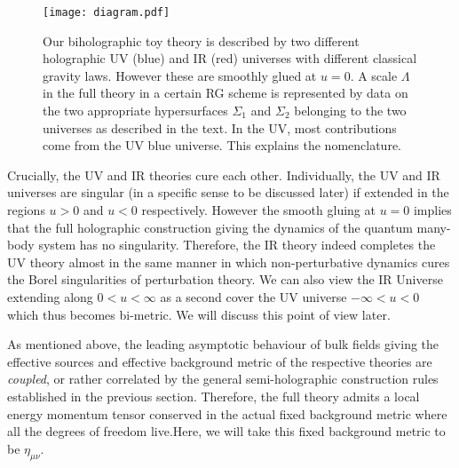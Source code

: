 \documentclass[prd,reprint,a4paper,showpacs,superscriptaddress,11pt,onecolumn,nofootinbib]{revtex4-1}
\renewcommand{\(}{\left(}
\renewcommand{\)}{\right)}
\newcommand{\6}{\partial}
\begin{document}
\begin{figure}[htbp]
\centering
\texttt{[image: diagram.pdf]}
\caption{Our biholographic toy theory is described by two different holographic UV (blue) and IR (red)  universes with different classical gravity laws. However these are smoothly glued at $u=0$. A scale $\Lambda$ in the full theory in a certain RG scheme is represented by data on the two appropriate hypersurfaces $\Sigma_1$ and $\Sigma_2$ belonging to the two universes as described in the text. In the UV, most contributions come from the UV blue universe. This explains the nomenclature.}
\label{fig:UVandIRUniverses}
\end{figure}

Crucially, the UV and IR theories cure each other. Individually, the UV and IR universes are singular (in a specific sense to be discussed later) if extended in the regions $u>0$ and $u<0$ respectively. However the smooth gluing at $u=0$ implies that the full holographic construction giving the dynamics of the quantum many-body system has no singularity. Therefore, the IR theory indeed completes the UV theory almost in the same manner in which non-perturbative dynamics cures the Borel singularities of perturbation theory. We can also view the IR Universe extending along $0<u<\infty$ as a second cover the UV universe $-\infty < u < 0$ which thus becomes bi-metric. We will discuss this point of view later.

As mentioned above, the leading asymptotic behaviour of bulk fields giving the effective sources and effective background metric of the respective theories are \textit{coupled}, or rather correlated by the general semi-holographic construction rules established in the previous section. Therefore, the full theory admits a local energy momentum tensor conserved in the actual fixed background metric where all the degrees of freedom live.Here, we will take this fixed background metric to be $\eta_{\mu\nu}$.
\end{document}
